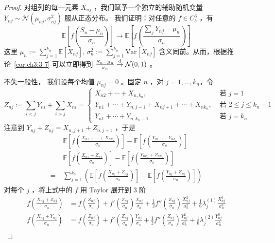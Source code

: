\begin{proof}

对组列的每一元素 $X_{nj}$ ，我们赋予一个独立的辅助随机变量 $Y_{nj}\sim \mathcal N(\mu_{nj},\sigma_{nj}^2)$ 服从正态分布。
我们证明：对任意的 $f\in C_b^3$ ，有 
$$\mathbb{E}\left[f\left(\frac{S_n-\mu_n}{\sigma_n}\right)\right]\to \mathbb{E}\left[f\left(\frac{\sum_j Y_{nj}-\mu_n}{\sigma_n}\right)\right]$$
这里 $\mu_n:=\sum_{j=1}^{k_n}\mathbb{E}[X_{nj}],\,\sigma_{n}^2:=\sum_{j=1}^{k_n}\mathrm{Var}[X_{nj}]$ 含义同前。从而，根据推论~\ref{cor:ch3:3-7} 可以立即得到 $\frac{S_n-\mu_n}{\sigma_n}\overset{\rm d}\to \mathcal{N}(0,1)$ 。

不失一般性， 我们设每个均值 $\mu_{nj}=0$ 。固定 $n$ ，对 $j=1,\dots,k_n$，令
\[Z_{nj} :=\sum_{i<j} Y_{ni} + \sum_{i>j} X_{ni}= \begin{cases} X_{n2}+\cdots+X_{n,k_n},&\text{ 若 }j=1\\ Y_{n1}+\cdots+Y_{n,j-1}+X_{n{j+1}}+\cdots+X_{nk_n},&\text{ 若 }2\le j\le k_n-1\\ Y_{n1}+\cdots+Y_{n,k_n-1}&\text{ 若 }j=k_n \end{cases}\]
注意到 $Y_{nj}+Z_{nj}=X_{n,j+1}+Z_{n,j+1}$ ，于是
\begin{equation}
\label{eq:ch3:tag-4}
\begin{aligned} &\mathbb{E}\left[f\left(\frac{X_{n1}+\cdots+X_{nk_n}}{\sigma_n}\right)\right]- \mathbb{E}\left[f\left(\frac{Y_{n1}+\cdots Y_{nk_n}}{\sigma_n}\right)\right]\\ =\;&\mathbb{E}\left[f\left(\frac{X_{n1}+Z_{n1}}{\sigma_n}\right)\right]- \mathbb{E}\left[f\left(\frac{Y_{nk_n}+Z_{nk_n}}{\sigma_n}\right)\right]\\ =\;&\sum_{j=1}^{k_n}\left(\mathbb{E}\left[f\left(\frac{X_{nj}+Z_{nj}}{\sigma_n}\right)\right]- \mathbb{E}\left[f\left(\frac{Y_{nj}+Z_{nj}}{\sigma_n}\right)\right]\right) \end{aligned}
\end{equation}
对每个 $j$ ，将上式中的 $f$ 用 Taylor 展开到 3 阶
\[\begin{aligned} f\left(\frac{X_{nj}+Z_{nj}}{\sigma_n}\right)&=f\left(\frac{Z_{nj}}{\sigma_n}\right)+f'\left(\frac{Z_{nj}}{\sigma_n}\right)\frac{X_{nj}}{\sigma_n}+\frac12f''\left(\frac{Z_{nj}}{\sigma_n}\right)\frac{X_{nj}^2}{\sigma_n^2}+\frac16\lambda_j^{(1)}\frac{X_{nj}^3}{\sigma_n^3}\\  f\left(\frac{X_{nj}+Y_{nj}}{\sigma_n}\right)&=f\left(\frac{Z_{nj}}{\sigma_n}\right)+f'\left(\frac{Z_{nj}}{\sigma_n}\right)\frac{Y_{nj}}{\sigma_n}+\frac12f''\left(\frac{Z_{nj}}{\sigma_n}\right)\frac{Y_{nj}^2}{\sigma_n^2}+\frac16\lambda_j^{(2)}\frac{Y_{nj}^3}{\sigma_n^3}\\ \end{aligned}\]

\end{proof}
